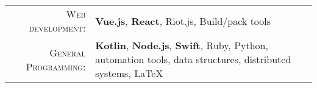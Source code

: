 %
%
%

\begin{tabular}{rl}
    \textsc{Web development:} & \textbf{Vue.js}, \textbf{React}, Riot.js, Build/pack tools \\ 
    \textsc{General Programming:} & \textbf{Kotlin}, \textbf{Node.js}, \textbf{Swift}, Ruby, Python, automation tools, data structures, distributed systems, LaTeX \\
\end{tabular}

